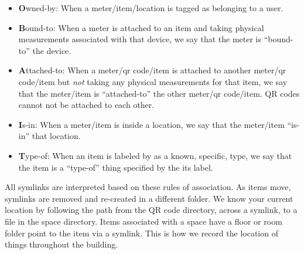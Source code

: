 \begin{itemize}
\item {\textbf Owned-by}: When a meter/item/location is tagged as belonging to a user.
\item {\textbf Bound-to}: When a meter is attached to an item and taking physical measurements associated with that 
		device, we say that the meter is ``bound-to'' the device.
\item {\textbf Attached-to}: When a meter/qr code/item is attached to another meter/qr code/item but \emph{not} taking any 
		physical measurements for that item, we say that the meter/item is ``attached-to'' the other meter/qr 
		code/item.  QR codes cannot not be attached to each other.
\item {\textbf Is-in}: When a meter/item is inside a location, we say that the meter/item ``is-in'' that location.
\item {\textbf Type-of}: When an item is labeled by as a known, specific, type, we say that the item is a ``type-of'' thing 
		specified by the its label.
\end{itemize}

All symlinks are interpreted based on these rules of association.  As items move, symlinks are removed and re-created
in a different folder.  We know your current location by following the path from the QR code directory, across a symlink, 
to a file in the space directory.  Items associated with a space have a floor or room folder point to the item
via a symlink.  This is how we record the location of things throughout the building.

